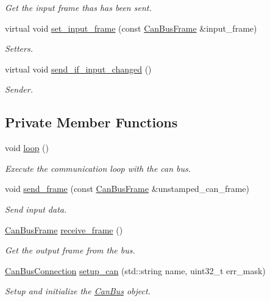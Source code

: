 \begin{DoxyCompactItemize}
\begin{DoxyCompactList}\small\item\em Get the input frame thas has been sent. \end{DoxyCompactList}\item 
virtual void \hyperlink{classblmc__drivers_1_1CanBus_ae4887644960c0a92fc82f8bdffbe9c48}{set\+\_\+input\+\_\+frame} (const \hyperlink{classblmc__drivers_1_1CanBusFrame}{Can\+Bus\+Frame} \&input\+\_\+frame)
\begin{DoxyCompactList}\small\item\em Setters. \end{DoxyCompactList}\item 
virtual void \hyperlink{classblmc__drivers_1_1CanBus_acf90b96ca5727f9ecb328ce20d7a2cbc}{send\+\_\+if\+\_\+input\+\_\+changed} ()
\begin{DoxyCompactList}\small\item\em Sender. \end{DoxyCompactList}\end{DoxyCompactItemize}
\subsection*{Private Member Functions}
\begin{DoxyCompactItemize}
\item 
\mbox{\label{classblmc__drivers_1_1CanBus_a65042f6d32e30c7c367d7e5780856a60}} 
void \hyperlink{classblmc__drivers_1_1CanBus_a65042f6d32e30c7c367d7e5780856a60}{loop} ()
\begin{DoxyCompactList}\small\item\em Execute the communication loop with the can bus. \end{DoxyCompactList}\item 
void \hyperlink{classblmc__drivers_1_1CanBus_ae445662e791d0b6149289d9df39e1ea0}{send\+\_\+frame} (const \hyperlink{classblmc__drivers_1_1CanBusFrame}{Can\+Bus\+Frame} \&unstamped\+\_\+can\+\_\+frame)
\begin{DoxyCompactList}\small\item\em Send input data. \end{DoxyCompactList}\item 
\hyperlink{classblmc__drivers_1_1CanBusFrame}{Can\+Bus\+Frame} \hyperlink{classblmc__drivers_1_1CanBus_ada25ff1dcd774666f423b23d4de664ea}{receive\+\_\+frame} ()
\begin{DoxyCompactList}\small\item\em Get the output frame from the bus. \end{DoxyCompactList}\item 
\hyperlink{classblmc__drivers_1_1CanBusConnection}{Can\+Bus\+Connection} \hyperlink{classblmc__drivers_1_1CanBus_a86826b4acc0833e041e6ea02824f8d48}{setup\+\_\+can} (std\+::string name, uint32\+\_\+t err\+\_\+mask)
\begin{DoxyCompactList}\small\item\em Setup and initialize the \hyperlink{classblmc__drivers_1_1CanBus}{Can\+Bus} object. \end{DoxyCompactList}\end{DoxyCompactItemize}
